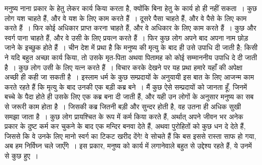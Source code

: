मनुष्य नाना प्रकार के हेतु लेकर कार्य किया करता है, क्योंकि बिना हेतु के कार्य हो ही नहीं सकता~। कुछ लोग यश चाहते हैं, और वे यश के लिए काम करते हैं~। दूसरे पैसा चाहते हैं, और वे पैसे के लिए काम करते हैं~। फिर कोई अधिकार प्राप्त करना चाहते हैं, और वे अधिकार के लिए काम करते हैं~। कुछ और स्वर्ग पाना चाहते हैं, और वे उसी के लिए प्रयत्न करते हैं~। फिर कुछ लोग अपने बाद अपना नाम छोड़ जाने के इच्छुक होते हैं~। चीन देश में प्रथा है कि मनुष्य की मृत्यु के बाद ही उसे उपाधि दी जाती है; किसी ने यदि बहुत अच्छा कार्य किया, तो उसके मृत-पिता अथवा पितामह को कोई सम्माननीय उपाधि दे दी जाती है~। कुछ लोग उसी के लिए यत्न करते हैं~। विचार करके देखने पर यह प्रथा हमारे यहाँ की अपेक्षा अच्छी ही कही जा सकती है~। इस्लाम धर्म के कुछ सम्प्रदायों के अनुयायी इस बात के लिए आजन्म काम करते रहते हैं कि मृत्यु के बाद उनकी एक बड़ी कब्र बने~। मैं कुछ ऐसे सम्प्रदायों को जानता हूँ, जिनमें बच्चे के पैदा होते ही उसके लिए एक कब्र बना दी जाती हैं, और यही उन लोगों के अनुसार मनुष्य का सब से जरूरी काम होता है~। जिसकी कब्र जितनी बड़ी और सुन्दर होती है, वह उतना ही अधिक सुखी समझा जाता है~। कुछ लोग प्रायश्चित के रूप में कर्म किया करते हैं, अर्थात् अपने जीवन भर अनेक प्रकार के दुष्ट कर्म कर चुकने के बाद एक मन्दिर बनवा देते हैं, अथवा पुरोहितों को कुछ धन दे देते हैं, जिससे कि वे उनके लिए मानो स्वर्ग का टिकट खरीद देंगे! वे सोचते हैं कि बस इससे रास्ता साफ हो गया, अब हम निर्विघ्न चले जाएँगे~। इस प्रकार, मनुष्य को कार्य में लगानेवाले बहुत से उद्देश्य रहते हैं, ये उनमें से कुछ हुए~।

